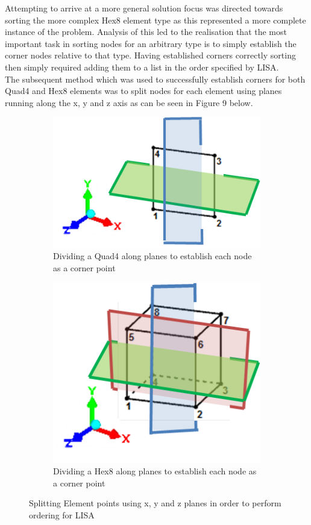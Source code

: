 \noindent
Attempting to arrive at a more general solution focus was directed towards sorting the more complex Hex8 element type as this represented a more complete instance of the problem. Analysis of this led to the realisation that the most important task in sorting nodes for an arbitrary type is to simply establish the corner nodes relative to that type. Having established corners correctly sorting then simply required adding them to a list in the order specified by LISA. \\

\noindent
The subsequent method which was used to successfully establish corners for both Quad4 and Hex8 elements was to split nodes for each element using planes running along the x, y and z axis as can be seen in Figure 9 below.

\begin{figure}[!h]
\centering
\begin{subfigure}{.5\textwidth}
  \centering
  \includegraphics[width=0.9\linewidth]{../Graphics/SortingQuad4.png}
  \caption{Dividing a Quad4 along planes to establish each node as a corner point}
  \label{fig:sub1}
\end{subfigure}%
\begin{subfigure}{.5\textwidth}
  \centering
  \includegraphics[width=0.7\linewidth]{../Graphics/SortingHex8.png}
  \caption{Dividing a Hex8 along planes to establish each node as a corner point}
  \label{fig:sub2}
\end{subfigure}
\caption{Splitting Element points using x, y and z planes in order to perform ordering for LISA}
\label{fig:test}
\end{figure}


